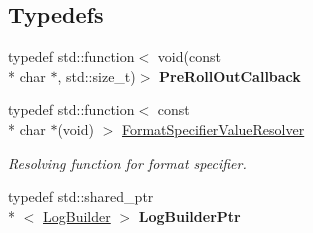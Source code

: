 \subsection*{Typedefs}
\begin{DoxyCompactItemize}
\item 
\hypertarget{namespaceel_aeb764b890a6f3cd41d2726bcd4e9c0cf}{typedef std\-::function$<$ void(const \\*
char $\ast$, std\-::size\-\_\-t)$>$ {\bfseries Pre\-Roll\-Out\-Callback}}\label{namespaceel_aeb764b890a6f3cd41d2726bcd4e9c0cf}

\item 
\hypertarget{namespaceel_a4d34c3ab99de9d5d2e531884d50bda3b}{typedef std\-::function$<$ const \\*
char $\ast$(void) $>$ \hyperlink{namespaceel_a4d34c3ab99de9d5d2e531884d50bda3b}{Format\-Specifier\-Value\-Resolver}}\label{namespaceel_a4d34c3ab99de9d5d2e531884d50bda3b}

\begin{DoxyCompactList}\small\item\em Resolving function for format specifier. \end{DoxyCompactList}\item 
\hypertarget{namespaceel_ad4c4b2f7d70a4b02568a9f70724a6b39}{typedef std\-::shared\-\_\-ptr\\*
$<$ \hyperlink{classel_1_1LogBuilder}{Log\-Builder} $>$ {\bfseries Log\-Builder\-Ptr}}\label{namespaceel_ad4c4b2f7d70a4b02568a9f70724a6b39}

\end{DoxyCompactItemize}
